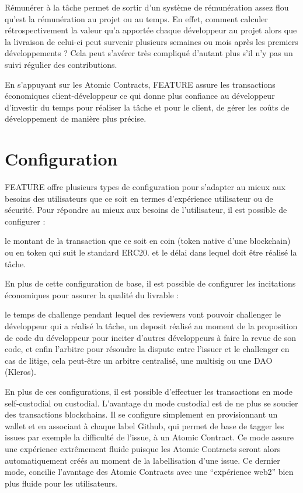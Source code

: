\documentclass[
	a4paper, %
	10pt, %
	unnumberedsections, %
	twoside, %
]{LTJournalArticle}
\begin{document}
Rémunérer à la tâche permet de sortir d’un système de rémunération assez flou qu’est la rémunération au projet ou au temps. En effet, comment calculer rétrospectivement la valeur qu’a apportée chaque développeur au projet alors que la livraison de celui-ci peut survenir plusieurs semaines ou mois après les premiers développements ? Cela peut s’avérer très compliqué d’autant plus s’il n’y pas un suivi régulier des contributions.

En s’appuyant sur les Atomic Contracts, FEATURE assure les transactions économiques client-développeur ce qui donne plus confiance au développeur d’investir du temps pour réaliser la tâche et pour le client, de gérer les coûts de développement de manière plus précise.



\section{Configuration}

FEATURE offre plusieurs types de configuration pour s’adapter au mieux aux besoins des utilisateurs que ce soit en termes d’expérience utilisateur ou de sécurité. Pour répondre au mieux aux besoins de l’utilisateur, il est possible de configurer : 


le montant de la transaction que ce soit en coin (token native d’une blockchain) ou en token qui suit le standard ERC20.
et le délai dans lequel doit être réalisé la tâche.



En plus de cette configuration de base, il est possible de configurer les incitations économiques pour assurer la qualité du livrable : 

le temps de challenge pendant lequel des reviewers vont pouvoir challenger le développeur qui a réalisé la tâche,
un deposit réalisé au moment de la proposition de code du développeur pour inciter d’autres développeurs à faire la revue de son code,
et enfin l’arbitre pour résoudre la dispute entre l’issuer et le challenger en cas de litige, cela peut-être un arbitre centralisé, une multisig ou une DAO (Kleros).

En plus de ces configurations, il est possible d’effectuer les transactions en mode self-custodial ou custodial. L’avantage du mode custodial est de ne plus se soucier des transactions blockchains. Il se configure simplement en provisionnant un wallet et en associant à chaque label Github, qui permet de base de tagger les issues par exemple la difficulté de l’issue, à un Atomic Contract. Ce mode assure une expérience extrêmement fluide puisque  les Atomic Contracts seront alors automatiquement créés au moment de la labellisation d’une issue. Ce dernier mode, concilie l’avantage des Atomic Contracts avec une “expérience web2” bien plus fluide pour les utilisateurs.
\end{document}

